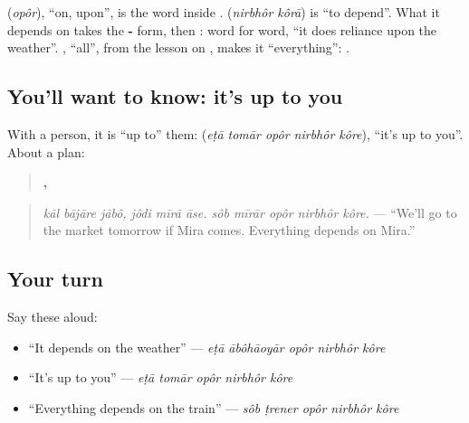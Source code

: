 \textbf{} (\emph{opôr}), \textquotedblleft{}on, upon\textquotedblright{}, is the word inside \textbf{}. \textbf{ } (\emph{nirbhôr kôrā}) is \textquotedblleft{}to depend\textquotedblright{}. What it depends on takes the \textbf{-} form, then \textbf{}: word for word, \textquotedblleft{}it does reliance upon the weather\textquotedblright{}. \textbf{}, \textquotedblleft{}all\textquotedblright{}, from the lesson on \textbf{}, makes it \textquotedblleft{}everything\textquotedblright{}: \textbf{    }.

\subsection*{You'll want to know: it's up to you}
With a person, it is \textquotedblleft{}up to\textquotedblright{} them: \textbf{    } (\emph{eṭā tomār opôr nirbhôr kôre}), \textquotedblleft{}it's up to you\textquotedblright{}. About a plan:

\begin{quote}
\textbf{  ,        }
\end{quote}

\begin{quote}
\emph{kāl bājāre jābô, jôdi mīrā āse. sôb mīrār opôr nirbhôr kôre.} — \textquotedblleft{}We'll go to the market tomorrow if Mira comes. Everything depends on Mira.\textquotedblright{}
\end{quote}

\subsection*{Your turn}
Say these aloud:

\begin{itemize}
\raggedright
  \item \textquotedblleft{}It depends on the weather\textquotedblright{} — \emph{eṭā ābôhāoyār opôr nirbhôr kôre}
  \item \textquotedblleft{}It's up to you\textquotedblright{} — \emph{eṭā tomār opôr nirbhôr kôre}
  \item \textquotedblleft{}Everything depends on the train\textquotedblright{} — \emph{sôb ṭrener opôr nirbhôr kôre}
\end{itemize}


